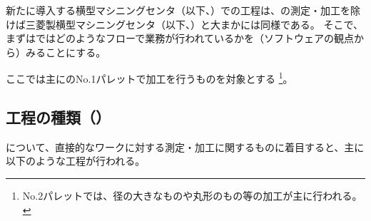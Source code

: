 

新たに導入する横型マシニングセンタ（以下、\textbf{\DMC}）での工程は、\Dimple の測定・加工を除けば三菱製横型マシニングセンタ（以下、\textbf{\MMC}）と大まかには同様である。
そこで、まずは\MMC ではどのようなフローで業務が行われているかを（ソフトウェアの観点から）みることにする。
\begin{marker}
ここでは主に\MMC のNo.1パレットで加工を行うものを対象とする
\footnote{No.2パレットでは、径の大きなものや丸形のもの等の加工が主に行われる。}。
\end{marker}





\subsection{工程の種類（\yomiMMC）}
\MMC について、直接的なワークに対する測定・加工に関するものに着目すると、主に以下のような工程が行われる。\\

